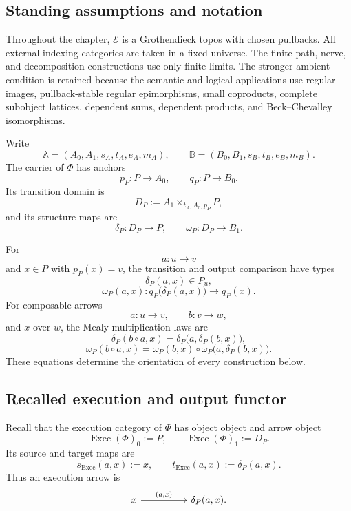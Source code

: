 \subsection{Standing assumptions and notation}
\label{subsec:temporal-standing-assumptions}

Throughout the chapter, \(\mathcal E\) is a Grothendieck topos with chosen
pullbacks. All external indexing categories are taken in a fixed universe.
The finite-path, nerve, and decomposition constructions use only finite
limits. The stronger ambient condition is retained because the semantic and
logical applications use regular images, pullback-stable regular
epimorphisms, small coproducts, complete subobject lattices, dependent sums,
dependent products, and Beck--Chevalley isomorphisms.

Write
\[
    \mathbb A=(A_0,A_1,s_A,t_A,e_A,m_A),
    \qquad
    \mathbb B=(B_0,B_1,s_B,t_B,e_B,m_B).
\]
The carrier of \(\Phi\) has anchors
\[
    p_P:P\to A_0,
    \qquad
    q_P:P\to B_0.
\]
Its transition domain is
\[
    D_P
    :=
    A_1\times_{t_A,A_0,p_P}P,
\]
and its structure maps are
\[
    \delta_P:D_P\to P,
    \qquad
    \omega_P:D_P\to B_1.
\]

For
\[
    a:u\to v
\]
and \(x\in P\) with \(p_P(x)=v\), the transition and output comparison
have types
\[
    \delta_P(a,x)\in P_u,
\]
\[
    \omega_P(a,x):
    q_P\bigl(\delta_P(a,x)\bigr)
    \longrightarrow
    q_P(x).
\]
For composable arrows
\[
    a:u\to v,
    \qquad
    b:v\to w,
\]
and \(x\) over \(w\), the Mealy multiplication laws are
\[
    \delta_P(b\circ a,x)
    =
    \delta_P\bigl(a,\delta_P(b,x)\bigr),
\]
\[
    \omega_P(b\circ a,x)
    =
    \omega_P(b,x)
    \circ
    \omega_P\bigl(a,\delta_P(b,x)\bigr).
\]
These equations determine the orientation of every construction below.

\subsection{Recalled execution and output functor}
\label{subsec:recalled-execution-output}

Recall that the execution category of \(\Phi\) has object object and arrow
object
\[
    \operatorname{Exec}(\Phi)_0:=P,
    \qquad
    \operatorname{Exec}(\Phi)_1:=D_P.
\]
Its source and target maps are
\[
    s_{\operatorname{Exec}}(a,x):=x,
    \qquad
    t_{\operatorname{Exec}}(a,x):=\delta_P(a,x).
\]
Thus an execution arrow is
\[
\begin{tikzcd}[column sep=huge]
    x
        \arrow[r, "{(a,x)}"]
    &
    \delta_P(a,x).
\end{tikzcd}
\]

